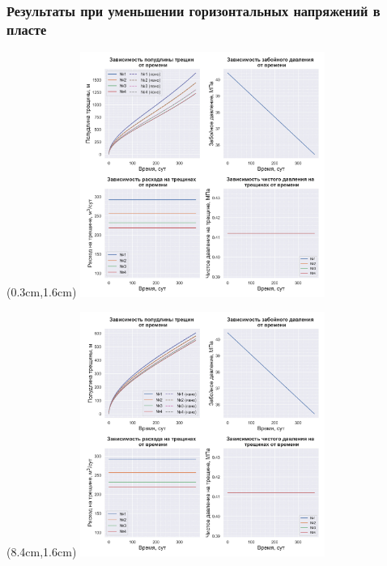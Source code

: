 \documentclass{beamer}
\begin{document}
\begin{frame}
\frametitle{Результаты при уменьшении горизонтальных напряжений в пласте}

\begin{textblock*}{8cm}(0.3cm,1.6cm)
\includegraphics[width=8cm]{myimage11.jpg}
\end{textblock*}

\begin{textblock*}{8cm}(8.4cm,1.6cm)
%
  {\includegraphics[width=8cm]{myimage12.jpg}}
\end{textblock*}

\end{frame}
\end{document}
